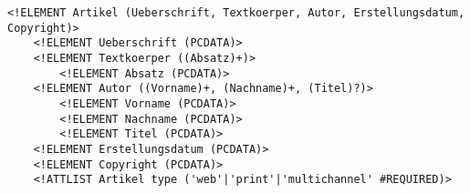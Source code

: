 \lstset{style=customXML}
\begin{lstlisting}
<!ELEMENT Artikel (Ueberschrift, Textkoerper, Autor, Erstellungsdatum, Copyright)>
    <!ELEMENT Ueberschrift (PCDATA)>
    <!ELEMENT Textkoerper ((Absatz)+)>
        <!ELEMENT Absatz (PCDATA)>
    <!ELEMENT Autor ((Vorname)+, (Nachname)+, (Titel)?)>
        <!ELEMENT Vorname (PCDATA)>
        <!ELEMENT Nachname (PCDATA)>
        <!ELEMENT Titel (PCDATA)>
    <!ELEMENT Erstellungsdatum (PCDATA)>
    <!ELEMENT Copyright (PCDATA)>
    <!ATTLIST Artikel type ('web'|'print'|'multichannel' #REQUIRED)>
\end{lstlisting}







































































